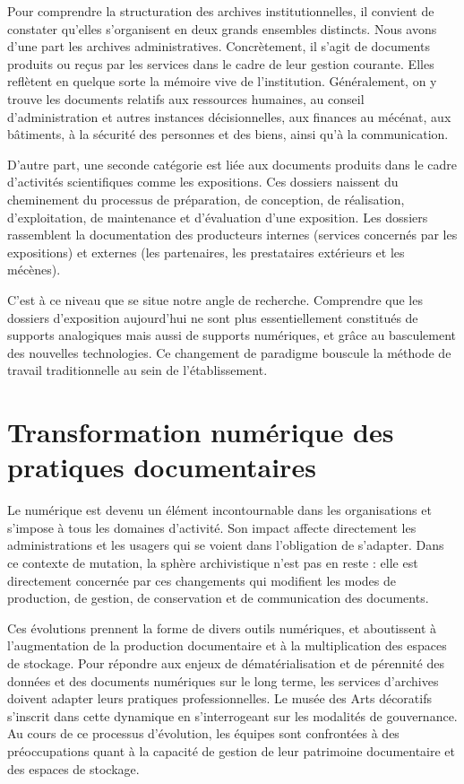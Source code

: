 Pour comprendre la structuration des archives institutionnelles, il convient de constater qu’elles s’organisent en deux grands ensembles distincts. Nous avons d’une part les archives administratives. Concrètement, il s’agit de documents produits ou reçus par les services dans le cadre de leur gestion courante. Elles reflètent en quelque sorte la mémoire vive de l’institution. Généralement, on y trouve les documents relatifs aux ressources humaines, au conseil d’administration et autres instances décisionnelles, aux finances au mécénat, aux bâtiments, à la sécurité des personnes et des biens, ainsi qu’à la communication. 

D’autre part, une seconde catégorie est liée aux documents produits dans le cadre d’activités scientifiques comme les expositions. Ces dossiers naissent du cheminement du processus de préparation, de conception, de réalisation, d’exploitation, de maintenance et d’évaluation d’une exposition. Les dossiers rassemblent la documentation des producteurs internes (services concernés par les expositions) et externes (les partenaires, les prestataires extérieurs et les mécènes).

C'est à ce niveau que se situe notre angle de recherche. Comprendre que les dossiers d’exposition aujourd’hui ne sont plus essentiellement constitués de supports analogiques mais aussi de supports numériques, et grâce au basculement des nouvelles technologies. Ce changement de paradigme bouscule la méthode de travail traditionnelle au sein de l’établissement.



\chapter{Transformation numérique des pratiques documentaires }

Le numérique est devenu un élément incontournable dans les organisations et s’impose à tous les domaines d’activité. Son impact affecte directement les administrations et les usagers qui se voient dans l’obligation de s'adapter. Dans ce contexte de mutation, la sphère archivistique n’est pas en reste : elle est directement concernée par ces changements qui modifient les modes de production, de gestion, de conservation et de communication des documents.

Ces évolutions prennent la forme de divers outils numériques, et aboutissent à l’augmentation de la production documentaire et à la multiplication des espaces de stockage. Pour répondre aux enjeux de dématérialisation et de pérennité des données et des documents numériques sur le long terme, les services d’archives doivent adapter leurs pratiques professionnelles. Le musée des Arts décoratifs s’inscrit dans cette dynamique en s’interrogeant sur les modalités de gouvernance. Au cours de ce processus d'évolution, les équipes sont confrontées à des préoccupations quant à la capacité de gestion de leur patrimoine documentaire et des espaces de stockage.

